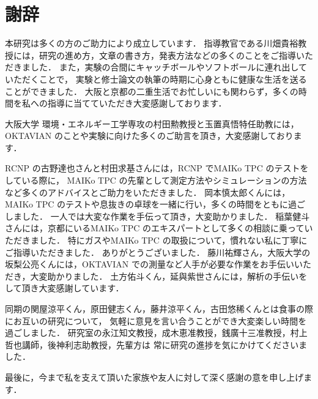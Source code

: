 \documentclass[../master]{subfiles}
\begin{document}
\chapter*{謝辞}
本研究は多くの方のご助力により成立しています．
指導教官である川畑貴裕教授には，研究の進め方，文章の書き方，発表方法などの多くのことをご指導いただきました．
また，実験の合間にキャッチボールやソフトボールに連れ出していただくことで，
実験と修士論文の執筆の時期に心身ともに健康な生活を送ることができました．
大阪と京都の二重生活でお忙しいにも関わらず，多くの時間を私への指導に当てていただき大変感謝しております．

大阪大学 環境・エネルギー工学専攻の村田勲教授と玉置真悟特任助教には，
OKTAVIAN のことや実験に向けた多くのご助言を頂き，大変感謝しております．

RCNP の古野達也さんと村田求基さんには，RCNP でMAIKo TPC のテストをしている際に，
MAIKo TPC の先輩として測定方法やシミュレーションの方法など多くのアドバイスとご助力をいただきました．
岡本慎太郎くんには，MAIKo TPC のテストや息抜きの卓球を一緒に行い，多くの時間をともに過ごしました．
一人では大変な作業を手伝って頂き，大変助かりました．
稲葉健斗さんには，京都にいるMAIKo TPC のエキスパートとして多くの相談に乗っていただきました．
特にガスやMAIKo TPC の取扱について，慣れない私に丁寧にご指導いただきました．
ありがとうございました．
藤川祐輝さん，大阪大学の坂梨公亮くんには，OKTAVIAN での測量など人手が必要な作業をお手伝いいただき，大変助かりました．
土方佑斗くん，延與紫世さんには，解析の手伝いをして頂き大変感謝しています．

同期の関屋涼平くん，原田健志くん，藤井涼平くん，古田悠稀くんとは食事の際にお互いの研究について，
気軽に意見を言い合うことができ大変楽しい時間を過ごしました．
研究室の永江知文教授，成木恵准教授，銭廣十三准教授，村上哲也講師，後神利志助教授，先輩方は
常に研究の進捗を気にかけてくださいました．

最後に，今まで私を支えて頂いた家族や友人に対して深く感謝の意を申し上げます．
\end{document}
